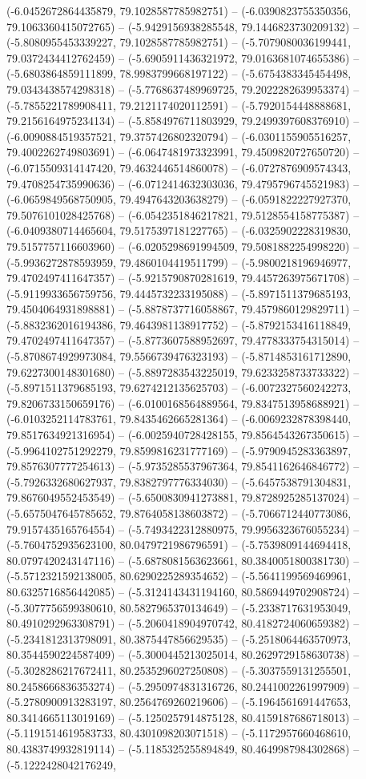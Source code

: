 (-6.0452672864435879, 79.1028587785982751) -- (-6.0390823755350356, 79.1063360415072765) -- (-5.9429156938285548, 79.1446823730209132) -- (-5.8080955453339227, 79.1028587785982751) -- (-5.7079080036199441, 79.0372434412762459) -- (-5.6905911436321972, 79.0163681074655386) -- (-5.6803864859111899, 78.9983799668197122) -- (-5.6754383345454498, 79.0343438574298318) -- (-5.7768637489969725, 79.2022282639953374) -- (-5.7855221789908411, 79.2121174020112591) -- (-5.7920154448888681, 79.2156164975234134) -- (-5.8584976711803929, 79.2499397608376910) -- (-6.0090884519357521, 79.3757426802320794) -- (-6.0301155905516257, 79.4002262749803691) -- (-6.0647481973323991, 79.4509820727650720) -- (-6.0715509314147420, 79.4632446514860078) -- (-6.0727876909574343, 79.4708254735990636) -- (-6.0712414632303036, 79.4795796745521983) -- (-6.0659849568750905, 79.4947643203638279) -- (-6.0591822227927370, 79.5076101028425768) -- (-6.0542351846217821, 79.5128554158775387) -- (-6.0409380714465604, 79.5175397181227765) -- (-6.0325902228319830, 79.5157757116603960) -- (-6.0205298691994509, 79.5081882254998220) -- (-5.9936272878593959, 79.4860104419511799) -- (-5.9800218196946977, 79.4702497411647357) -- (-5.9215790870281619, 79.4457263975671708) -- (-5.9119933656759756, 79.4445732233195088) -- (-5.8971511379685193, 79.4504064931898881) -- (-5.8878737716058867, 79.4579860129829711) -- (-5.8832362016194386, 79.4643981138917752) -- (-5.8792153416118849, 79.4702497411647357) -- (-5.8773607588952697, 79.4778333754315014) -- (-5.8708674929973084, 79.5566739476323193) -- (-5.8714853161712890, 79.6227300148301680) -- (-5.8897283543225019, 79.6233258733733322) -- (-5.8971511379685193, 79.6274212135625703) -- (-6.0072327560242273, 79.8206733150659176) -- (-6.0100168564889564, 79.8347513958688921) -- (-6.0103252114783761, 79.8435462665281364) -- (-6.0069232878398440, 79.8517634921316954) -- (-6.0025940728428155, 79.8564543267350615) -- (-5.9964102751292279, 79.8599816231777169) -- (-5.9790945283363897, 79.8576307777254613) -- (-5.9735285537967364, 79.8541162646846772) -- (-5.7926332680627937, 79.8382797776334030) -- (-5.6457538791304831, 79.8676049552453549) -- (-5.6500830941273881, 79.8728925285137024) -- (-5.6575047645785652, 79.8764058138603872) -- (-5.7066712440773086, 79.9157435165764554) -- (-5.7493422312880975, 79.9956323676055234) -- (-5.7604752935623100, 80.0479721986796591) -- (-5.7539809144694418, 80.0797420243147116) -- (-5.6878081563623661, 80.3840051800381730) -- (-5.5712321592138005, 80.6290225289354652) -- (-5.5641199569469961, 80.6325716856442085) -- (-5.3124143431194160, 80.5869449702908724) -- (-5.3077756599380610, 80.5827965370134649) -- (-5.2338717631953049, 80.4910292963308791) -- (-5.2060418904970742, 80.4182724060659382) -- (-5.2341812313798091, 80.3875447856629535) -- (-5.2518064463570973, 80.3544590224587409) -- (-5.3000445213025014, 80.2629729158630738) -- (-5.3028286217672411, 80.2535296027250808) -- (-5.3037559131255501, 80.2458666836353274) -- (-5.2950974831316726, 80.2441002261997909) -- (-5.2780900913283197, 80.2564769260219606) -- (-5.1964561691447653, 80.3414665113019169) -- (-5.1250257914875128, 80.4159187686718013) -- (-5.1191514619583733, 80.4301098203071518) -- (-5.1172957660468610, 80.4383749932819114) -- (-5.1185325255894849, 80.4649987984302868) -- (-5.1222428042176249, 